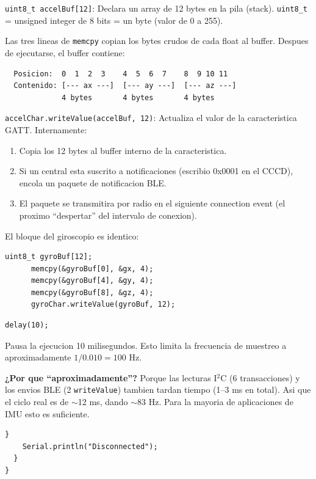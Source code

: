 \documentclass[11pt,a4paper]{article}
\begin{document}
\texttt{uint8\_t accelBuf[12]}: Declara un array de 12 bytes en la
pila (stack). \texttt{uint8\_t} = unsigned integer de 8 bits = un
byte (valor de 0 a 255).

Las tres lineas de \texttt{memcpy} copian los bytes crudos de cada
float al buffer. Despues de ejecutarse, el buffer contiene:

\begin{verbatim}
  Posicion:  0  1  2  3    4  5  6  7    8  9 10 11
  Contenido: [--- ax ---]  [--- ay ---]  [--- az ---]
             4 bytes       4 bytes       4 bytes
\end{verbatim}

\texttt{accelChar.writeValue(accelBuf, 12)}: Actualiza el valor de
la caracteristica GATT. Internamente:
\begin{enumerate}
    \item Copia los 12 bytes al buffer interno de la caracteristica.
    \item Si un central esta suscrito a notificaciones (escribio
          0x0001 en el CCCD), encola un paquete de notificacion
          BLE.
    \item El paquete se transmitira por radio en el siguiente
          connection event (el proximo ``despertar'' del intervalo
          de conexion).
\end{enumerate}

El bloque del giroscopio es identico:

\begin{lstlisting}[style=arduino]
      uint8_t gyroBuf[12];
      memcpy(&gyroBuf[0], &gx, 4);
      memcpy(&gyroBuf[4], &gy, 4);
      memcpy(&gyroBuf[8], &gz, 4);
      gyroChar.writeValue(gyroBuf, 12);
\end{lstlisting}

\begin{lstlisting}[style=arduino]
      delay(10);
\end{lstlisting}

Pausa la ejecucion 10 milisegundos. Esto limita la frecuencia de
muestreo a aproximadamente $1/0.010 = 100$ Hz.

\textbf{¿Por que ``aproximadamente''?} Porque las lecturas I$^2$C
(6 transacciones) y los envios BLE (2 \texttt{writeValue}) tambien
tardan tiempo (1--3 ms en total). Asi que el ciclo real es de
$\sim$12 ms, dando $\sim$83 Hz. Para la mayoria de aplicaciones
de IMU esto es suficiente.

\begin{lstlisting}[style=arduino]
    }
    Serial.println("Disconnected");
  }
}
\end{lstlisting}
\end{document}
